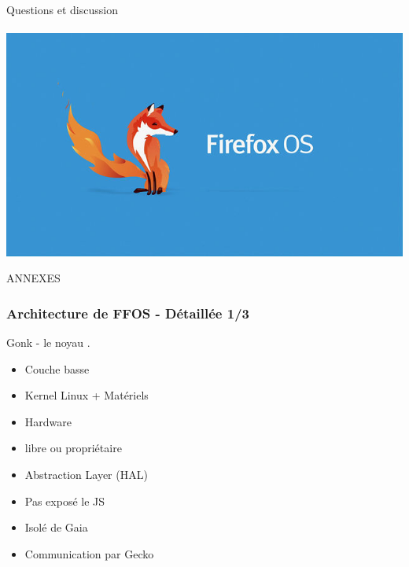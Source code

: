 \documentclass{beamer}
\begin{document}
\begin{frame}
\begin{center}
\Huge{Questions et discussion}
\\~\\
\includegraphics[scale=0.3]{./images/firefox-os.jpg}
\end{center}
\end{frame}

\begin{frame}
\begin{center}
\Huge{ANNEXES}
\end{center}
\end{frame}

\begin{frame}
\frametitle{Architecture de FFOS - Détaillée 1/3}
\begin{block}{Gonk - le noyau}
.
\begin{itemize}
\item Couche basse
\item Kernel Linux + Matériels
\item Hardware
\item libre ou propriétaire
\item Abstraction Layer (HAL)
\item Pas exposé le JS
\item Isolé de Gaia
\item Communication par Gecko
\end{itemize}
\end{block}
\end{frame}
\end{document}
